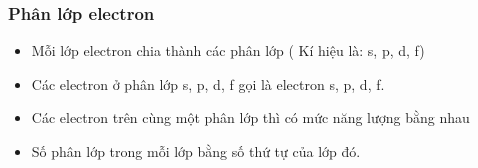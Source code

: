 \subsubsection{Phân lớp electron}
\begin{hoplythuyet}
	\begin{itemize}
		\item Mỗi lớp electron chia thành các phân lớp ( Kí hiệu là: s, p, d, f)
		\item Các electron ở phân lớp s, p, d, f gọi là electron s, p, d, f.
		\item Các electron trên cùng một phân lớp thì có mức năng lượng bằng nhau
		\item Số phân lớp trong mỗi lớp bằng số thứ tự  của lớp đó.
	\end{itemize}
\end{hoplythuyet}

